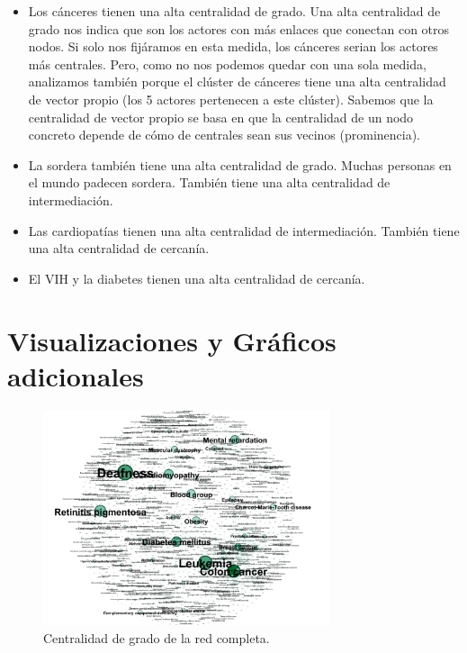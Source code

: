 \documentclass{uimppracticas}
\begin{document}
\begin{itemize}
	\item Los cánceres tienen una alta centralidad de grado. Una alta centralidad de grado nos indica que son los actores con más enlaces que conectan con otros nodos. Si solo nos fijáramos en esta medida, los cánceres serian los actores más centrales. Pero, como no nos podemos quedar con una sola medida, analizamos también porque el clúster de cánceres tiene una alta centralidad de vector propio (los 5 actores pertenecen a este clúster). Sabemos que la centralidad de vector propio se basa en que la centralidad de un nodo concreto depende de cómo de centrales sean sus vecinos (prominencia).
	\item La sordera también tiene una alta centralidad de grado. Muchas personas en el mundo padecen sordera. También tiene una alta centralidad de intermediación.
	\item Las cardiopatías tienen una alta centralidad de intermediación. También tiene una alta centralidad de cercanía.
	\item El VIH y la diabetes tienen una alta centralidad de cercanía.
\end{itemize}

\newpage

\section*{Visualizaciones y Gráficos adicionales}

\begin{figure}[H]
	\centering
	\includegraphics[width=0.75\textwidth]{images/Grado-Centrality}
	\caption{Centralidad de grado de la red completa.}
	\label{Grado-Centrality}
\end{figure}
\end{document}
